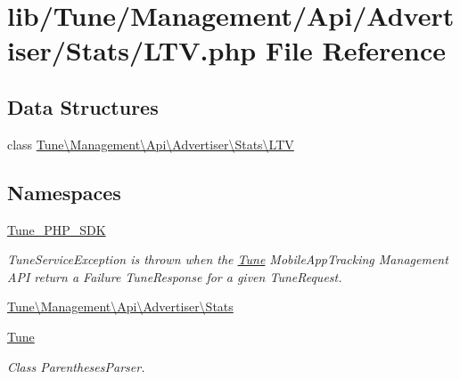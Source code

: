 \hypertarget{LTV_8php}{\section{lib/\-Tune/\-Management/\-Api/\-Advertiser/\-Stats/\-L\-T\-V.php File Reference}
\label{LTV_8php}
}
\subsection*{Data Structures}
\begin{DoxyCompactItemize}
\item 
class \hyperlink{classTune_1_1Management_1_1Api_1_1Advertiser_1_1Stats_1_1LTV}{Tune\textbackslash{}\-Management\textbackslash{}\-Api\textbackslash{}\-Advertiser\textbackslash{}\-Stats\textbackslash{}\-L\-T\-V}
\end{DoxyCompactItemize}
\subsection*{Namespaces}
\begin{DoxyCompactItemize}
\item 
\hyperlink{namespaceTune__PHP__SDK}{Tune\-\_\-\-P\-H\-P\-\_\-\-S\-D\-K}
\begin{DoxyCompactList}\small\item\em Tune\-Service\-Exception is thrown when the \hyperlink{namespaceTune}{Tune} Mobile\-App\-Tracking Management A\-P\-I return a Failure Tune\-Response for a given Tune\-Request. \end{DoxyCompactList}\item 
\hyperlink{namespaceTune_1_1Management_1_1Api_1_1Advertiser_1_1Stats}{Tune\textbackslash{}\-Management\textbackslash{}\-Api\textbackslash{}\-Advertiser\textbackslash{}\-Stats}
\item 
\hyperlink{namespaceTune}{Tune}
\begin{DoxyCompactList}\small\item\em Class Parentheses\-Parser. \end{DoxyCompactList}\end{DoxyCompactItemize}
